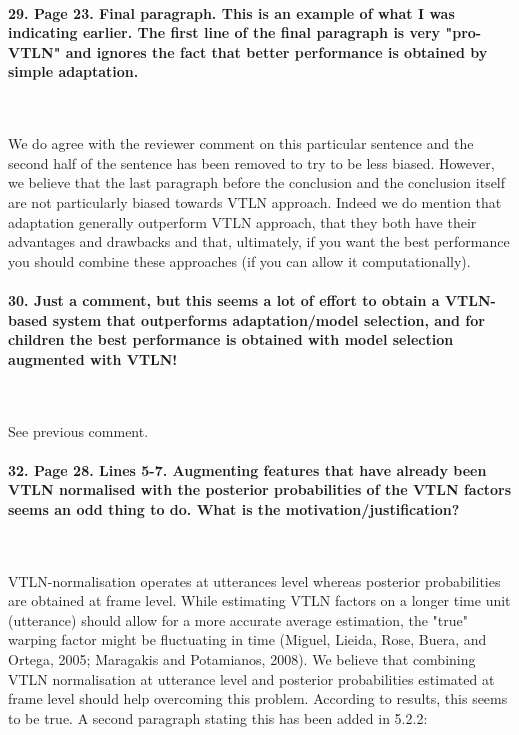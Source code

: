 \documentclass[]{article}
\begin{document}
\paragraph{29. Page 23. Final paragraph. This is an example of what I was indicating earlier. The first line of the final paragraph is very "pro-VTLN" and ignores the fact that better performance is obtained by simple adaptation.}

~

We do agree with the reviewer comment on this particular sentence and the second half of the sentence has been removed to try to be less biased. However, we believe that the last paragraph before the conclusion and the conclusion itself are not particularly biased towards VTLN approach. Indeed we do mention that adaptation generally outperform VTLN approach, that they both have their advantages and drawbacks and that, ultimately, if you want the best performance you should combine these approaches (if you can allow it computationally).

\paragraph{30. Just a comment, but this seems a lot of effort to obtain a VTLN-based system that outperforms adaptation/model selection, and for children the best performance is obtained with model selection augmented with VTLN!}

~

See previous comment.

\paragraph{32. Page 28. Lines 5-7. Augmenting features that have already been VTLN normalised with the posterior probabilities of the VTLN factors seems an odd thing to do. What is the motivation/justification?}

~

VTLN-normalisation operates at utterances level whereas posterior probabilities are obtained at frame level. While estimating VTLN factors on a longer time unit (utterance) should allow for a more accurate average estimation, the "true" warping factor might be fluctuating in time (Miguel, Lieida, Rose, Buera, and Ortega, 2005; Maragakis and Potamianos,
2008). We believe that combining VTLN normalisation at utterance level and posterior probabilities estimated at frame level should help overcoming this problem. According to results, this seems to be true. A second paragraph stating this has been added in 5.2.2:
\end{document}
